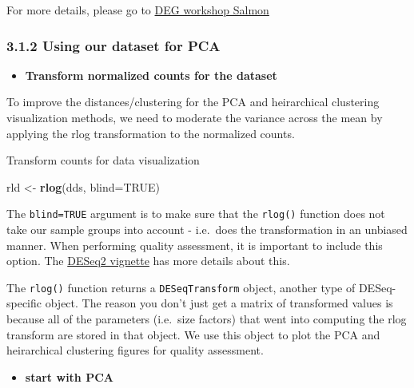 \documentclass[
]{article}
\newenvironment{Shaded}{\begin{snugshade}}{\end{snugshade}}
\newcommand{\AttributeTok}[1]{\textcolor[rgb]{0.13,0.29,0.53}{#1}}
\newcommand{\ConstantTok}[1]{\textcolor[rgb]{0.56,0.35,0.01}{#1}}
\newcommand{\FunctionTok}[1]{\textcolor[rgb]{0.13,0.29,0.53}{\textbf{#1}}}
\newcommand{\NormalTok}[1]{#1}
\newcommand{\OtherTok}[1]{\textcolor[rgb]{0.56,0.35,0.01}{#1}}
\providecommand{\tightlist}{%
  \setlength{\itemsep}{0pt}\setlength{\parskip}{0pt}}
\begin{document}
For more details, please go to
\href{https://github.com/zilanwen/DGE_workshop_salmon_online/blob/master/lessons/03_DGE_QC_analysis.md}{DEG
workshop Salmon}

\subsubsection{3.1.2 Using our dataset for
PCA}\label{using-our-dataset-for-pca}

\begin{itemize}
\tightlist
\item
  \textbf{Transform normalized counts for the dataset}
\end{itemize}

To improve the distances/clustering for the PCA and heirarchical
clustering visualization methods, we need to moderate the variance
across the mean by applying the rlog transformation to the normalized
counts.

Transform counts for data visualization

\begin{Shaded}
\begin{Highlighting}[]
\NormalTok{rld }\OtherTok{\textless{}{-}} \FunctionTok{rlog}\NormalTok{(dds, }\AttributeTok{blind=}\ConstantTok{TRUE}\NormalTok{)}
\end{Highlighting}
\end{Shaded}

The \texttt{blind=TRUE} argument is to make sure that the
\texttt{rlog()} function does not take our sample groups into account -
i.e.~does the transformation in an unbiased manner. When performing
quality assessment, it is important to include this option. The
\href{https://bioconductor.org/packages/devel/bioc/vignettes/DESeq2/inst/doc/DESeq2.html\#blind-dispersion-estimation}{DESeq2
vignette} has more details about this.

The \texttt{rlog()} function returns a \texttt{DESeqTransform} object,
another type of DESeq-specific object. The reason you don't just get a
matrix of transformed values is because all of the parameters (i.e.~size
factors) that went into computing the rlog transform are stored in that
object. We use this object to plot the PCA and heirarchical clustering
figures for quality assessment.

\begin{itemize}
\tightlist
\item
  \textbf{start with PCA}
\end{itemize}
\end{document}
